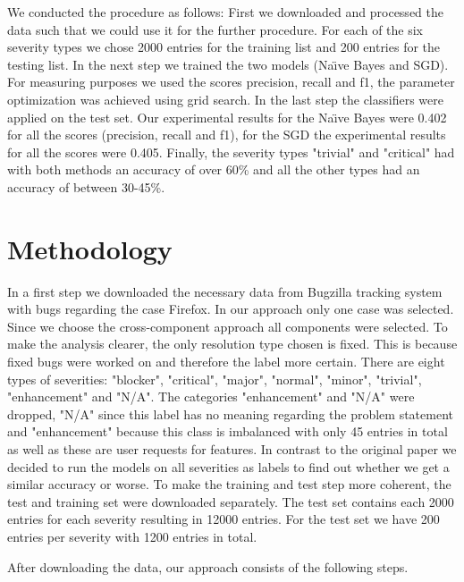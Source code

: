 \documentclass[sigconf,screen]{acmart}
\begin{document}
We conducted the procedure as follows: First we downloaded and processed the data such that we could use it for the further procedure. For each of the six severity types we chose 2000 entries for the training list and 200 entries for the testing list. In the next step we trained the two models (Na{\"\i}ve Bayes and SGD). For measuring purposes we used the scores precision, recall and f1, the parameter optimization was achieved using grid search. In the last step the classifiers were applied on the test set. Our experimental results for the Na{\"\i}ve Bayes were 0.402 for all the scores (precision, recall and f1), for the SGD the experimental results for all the scores were  0.405. Finally, the severity types "trivial" and "critical" had with both methods an accuracy of over 60\% and all the other types had an accuracy of between 30-45\%.

\section{Methodology}
In a first step we downloaded the necessary data from Bugzilla tracking system with bugs regarding the case Firefox. In our approach only one case was selected. Since we choose the cross-component approach all components were selected. To make the analysis clearer, the only resolution type chosen is fixed. This is because fixed bugs were worked on and therefore the label more certain. There are eight types of severities: "blocker", "critical", "major", "normal", "minor", "trivial", "enhancement" and "N/A". The categories "enhancement" and "N/A" were dropped, "N/A" since this label has no meaning regarding the problem statement and "enhancement" because this class is imbalanced with only 45 entries in total as well as these are user requests for features. In contrast to the original paper we decided to run the models on all severities as labels to find out whether we get a similar accuracy or worse. To make the training and test step more coherent, the test and training set were downloaded separately. The test set contains each 2000 entries for each severity resulting in 12000 entries. For the test set we have 200 entries per severity with 1200 entries in total.

After downloading the data, our approach consists of the following steps.
\end{document}

